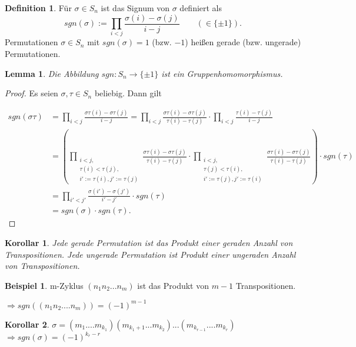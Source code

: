 \documentclass[12pt]{scrartcl}%
\newtheorem{lemma}{Lemma}
\newtheorem{kor}{Korollar}
\theoremstyle{definition}
\newtheorem*{defn}{Definition}
\newtheorem{ex}{Beispiel}
\theoremstyle{remark}
\begin{document}
\begin{defn}
Für $\sigma\in S_n$ ist das Signum von $\sigma$ definiert als
    \[sgn(\sigma) := \prod_{i<j}\frac{\sigma(i)-\sigma(j)}{i-j}\qquad(\in\{\pm 1\}).\]
Permutationen $\sigma\in S_n$ mit $sgn(\sigma) = 1$ (bzw. $-1$) heißen gerade (bzw. ungerade) Permutationen.
\end{defn}

\begin{lemma}
Die Abbildung $sgn:S_n\to\{\pm 1\}$ ist ein Gruppenhomomorphismus.
\end{lemma}

\begin{proof}
Es seien $\sigma,\tau\in S_n$ beliebig. Dann gilt 

\begin{equation*}
    \begin{split}
        sgn(\sigma\tau) &= \prod_{i<j}\frac{\sigma\tau(i)-\sigma\tau(j)}{i-j} = \prod_{i<j}\frac{\sigma\tau(i)-\sigma\tau(j)}{\tau(i)-\tau(j)}\cdot\prod_{i<j}\frac{\tau(i)-\tau(j)}{i-j} \\
        &= \left(\prod_{\substack{i<j,\\\tau(i)<\tau(j),\\ i':=\tau(i),j':=\tau(j)}}\frac{\sigma\tau(i)-\sigma\tau(j)}{\tau(i)-\tau(j)}\cdot \prod_{\substack{i<j,\\\tau(j)<\tau(i),\\ i':=\tau(j),j':=\tau(i)}}\frac{\sigma\tau(i)-\sigma\tau(j)}{\tau(i)-\tau(j)}\right)\cdot sgn(\tau) \\
        &=\prod_{i'<j'}\frac{\sigma(i')-\sigma(j')}{i'-j'}\cdot sgn(\tau) \\
        &= sgn(\sigma)\cdot sgn(\tau).
    \end{split}
\end{equation*}
\end{proof}

\newpage
	\begin{kor}
	Jede gerade Permutation ist das Produkt einer geraden Anzahl von Transpositionen. Jede ungerade Permutation ist Produkt einer ungeraden Anzahl von Transpositionen.
	\end{kor}

	\begin{ex}
	m-Zyklus $(n_1n_2...n_m)$ ist das Produkt von $m-1$ Transpositionen.  
	
	$\Rightarrow sgn((n_1n_2....n_m))=(-1)^{m-1}$
	\end{ex}

	\begin{kor}
	$\sigma = (m_1....m_{k_1})(m_{k_1+1}...m_{k_2})...(m_{k_{r-1}}....m_{k_r})$	$\Rightarrow sgn(\sigma)=(-1)^{k_r-r}$
	\end{kor}
\end{document}
